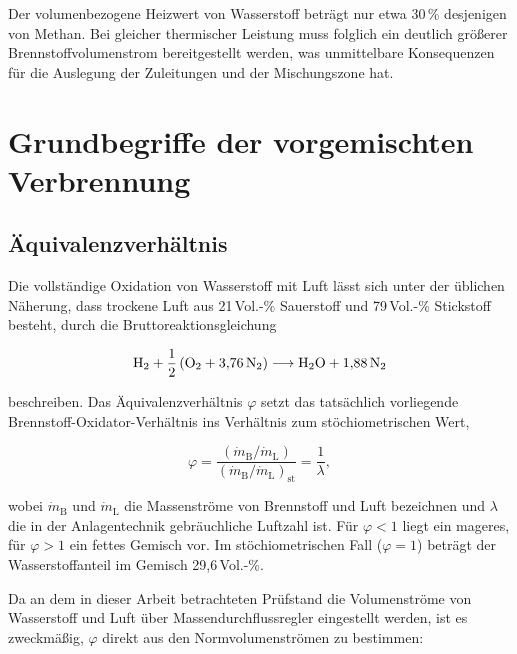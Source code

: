 Der volumenbezogene Heizwert von Wasserstoff beträgt nur etwa
30\,\% desjenigen von Methan. Bei gleicher thermischer Leistung muss folglich
ein deutlich größerer Brennstoffvolumenstrom bereitgestellt werden, was
unmittelbare Konsequenzen für die Auslegung der Zuleitungen und der
Mischungszone hat.

\section{Grundbegriffe der vorgemischten Verbrennung}\label{sec:vormischverbrennung}

\subsection{Äquivalenzverhältnis}\label{subsec:phi}

Die vollständige Oxidation von Wasserstoff mit Luft lässt sich unter der
üblichen Näherung, dass trockene Luft aus 21\,Vol.-\% Sauerstoff und
79\,Vol.-\% Stickstoff besteht, durch die Bruttoreaktionsgleichung

\begin{equation}
	\label{eq:bruttoreaktion}
	\ce{H2} + \frac{1}{2}\left(\ce{O2} + 3{,}76\,\ce{N2}\right)
	\longrightarrow \ce{H2O} + 1{,}88\,\ce{N2}
\end{equation}

beschreiben. Das Äquivalenzverhältnis $\varphi$ setzt das tatsächlich
vorliegende Brennstoff-Oxidator-Verhältnis ins Verhältnis zum
stöchiometrischen Wert,

\begin{equation}
	\label{eq:phi}
	\varphi = \frac{\left(\dot{m}_\mathrm{B}/\dot{m}_\mathrm{L}\right)}
	               {\left(\dot{m}_\mathrm{B}/\dot{m}_\mathrm{L}\right)_\mathrm{st}}
	        = \frac{1}{\lambda},
\end{equation}

wobei $\dot{m}_\mathrm{B}$ und $\dot{m}_\mathrm{L}$ die Massenströme von
Brennstoff und Luft bezeichnen und $\lambda$ die in der Anlagentechnik
gebräuchliche Luftzahl ist. Für $\varphi < 1$ liegt ein mageres, für
$\varphi > 1$ ein fettes Gemisch vor. Im stöchiometrischen Fall
($\varphi = 1$) beträgt der Wasserstoffanteil im Gemisch 29,6\,Vol.-\%.

Da an dem in dieser Arbeit betrachteten Prüfstand die Volumenströme von
Wasserstoff und Luft über Massendurchflussregler eingestellt werden, ist es
zweckmäßig, $\varphi$ direkt aus den Normvolumenströmen zu bestimmen:

